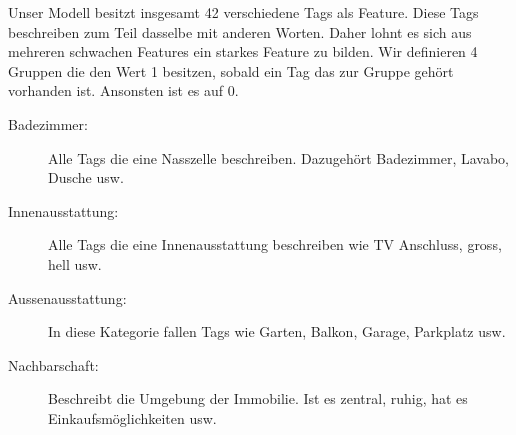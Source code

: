 \begin{table}[ht]
\centering
{}
\caption{Ergebnisse mit Einbezug des Steuerfuss}
\label{tab:sixth_round}
\end{table}
%
Unser Modell besitzt insgesamt 42 verschiedene Tags als Feature. Diese Tags beschreiben zum Teil dasselbe mit anderen Worten. Daher lohnt es sich aus mehreren schwachen Features ein starkes Feature zu bilden. Wir definieren 4 Gruppen die den Wert 1 besitzen, sobald ein Tag das zur Gruppe gehört vorhanden ist. Ansonsten ist es auf 0.
\begin{description}
\item[Badezimmer:] Alle Tags die eine Nasszelle beschreiben. Dazugehört Badezimmer, Lavabo, Dusche usw.
\item[Innenausstattung:] Alle Tags die eine Innenausstattung beschreiben wie TV Anschluss, gross, hell usw. 
\item[Aussenausstattung:] In diese Kategorie fallen Tags wie Garten, Balkon, Garage, Parkplatz usw.
\item[Nachbarschaft:] Beschreibt die Umgebung der Immobilie. Ist es zentral, ruhig, hat es Einkaufsmöglichkeiten usw.
\end{description}
%
\begin{table}[ht]
\centering
{}
\caption{Ergebnisse mit gruppierten Tags}
\label{tab:seventh_round}
\end{table}
